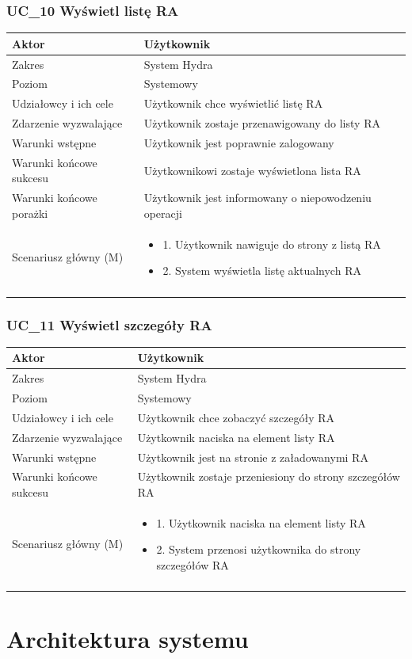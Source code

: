 \documentclass[oneside]{scrreprt}
\newcommand\addheading[2]{#1 &#2\\ \hline}
\newcommand\tabularhead{\begin{center} \begin{tabular}{lp{8cm}}
		\hline
	}
\newcommand\addmulrow[2]{ \begin{minipage}[t][][t]{6cm}#1\end{minipage}%
		&\begin{minipage}[t][][t]{8cm}
			\begin{itemize} #2 \newline \end{itemize}
		\end{minipage}\\ \\  \hline}
\newenvironment{usecase}{\tabularhead}
	{\hline\end{tabular} \end{center}}
\begin{document}
\subsection{UC\_10 Wyświetl listę RA}
\begin{usecase}
	\addheading{Aktor}{Użytkownik} 
	\addheading{Zakres}{System Hydra}
	\addheading{Poziom}{Systemowy}
	\addheading{Udziałowcy i ich cele}{Użytkownik chce wyświetlić listę RA}
	\addheading{Zdarzenie wyzwalające}{Użytkownik zostaje przenawigowany do listy RA}
	\addheading{Warunki wstępne}{Użytkownik jest poprawnie zalogowany}
	\addheading{Warunki końcowe sukcesu}{Użytkownikowi zostaje wyświetlona lista RA}
	\addheading{Warunki końcowe porażki}{Użytkownik jest informowany o niepowodzeniu operacji}
	\addmulrow{Scenariusz główny (M)}{
		\item[] 1. Użytkownik nawiguje do strony z listą RA
		\item[] 2. System wyświetla listę aktualnych RA
	}
\end{usecase}

\subsection{UC\_11 Wyświetl szczegóły RA}
\begin{usecase}
	\addheading{Aktor}{Użytkownik} 
	\addheading{Zakres}{System Hydra}
	\addheading{Poziom}{Systemowy}
	\addheading{Udziałowcy i ich cele}{Użytkownik chce zobaczyć szczegóły RA}
	\addheading{Zdarzenie wyzwalające}{Użytkownik naciska na element listy RA}
	\addheading{Warunki wstępne}{Użytkownik jest na stronie z załadowanymi RA}
	\addheading{Warunki końcowe sukcesu}{Użytkownik zostaje przeniesiony do strony szczegółów RA}
	\addmulrow{Scenariusz główny (M)}{
		\item[] 1. Użytkownik naciska na element listy RA
		\item[] 2. System przenosi użytkownika do strony szczegółów RA
	}
\end{usecase}

\chapter{Architektura systemu}
\end{document}
